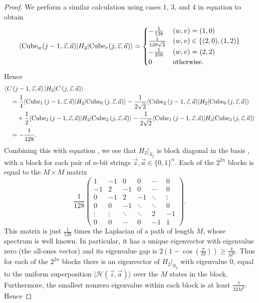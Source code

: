 \documentclass[../thesis-main/thesis-main]{subfiles}
\begin{document}
\begin{proof}
We perform a similar calculation using cases 1, 3, and 4 in equation  to obtain
\[
\langle{\operatorname{Cube}_{w}(j-1,\vec{z},\vec{a})}|H_{2}|{\operatorname{Cube}_{v}(j,\vec{z},\vec{a})}\rangle=\begin{cases}
-\frac{1}{128} & (w,v)=(1,0)\\
\frac{1}{128\sqrt{2}} & (w,v)\in\{(2,0),(1,2)\}\\
-\frac{1}{256} & (w,v)=(2,2)\\
0 & \text{otherwise.}
\end{cases}
\]
Hence 
\begin{align*}
 & \langle C\left(j-1,\vec{z},\vec{a}\right)|H_{2}|C\left(j,\vec{z},\vec{a}\right)\rangle\\
 &\quad =\frac{1}{4}\langle{\operatorname{Cube}_{1}\left(j-1,\vec{z},\vec{a}\right)}|H_{2}|{\operatorname{Cube}_{0}\left(j,\vec{z},\vec{a}\right)}\rangle-\frac{1}{2\sqrt{2}}\langle{\operatorname{Cube}_{2}\left(j-1,\vec{z},\vec{a}\right)}|H_{2}|{\operatorname{Cube}_{0}\left(j,\vec{z},\vec{a}\right)}\rangle\\
 &\qquad +\frac{1}{2}\langle{\operatorname{Cube}_{2}\left(j-1,\vec{z},\vec{a}\right)}|H_{2}|{\operatorname{Cube}_{2}\left(j,\vec{z},\vec{a}\right)}\rangle-\frac{1}{2\sqrt{2}}\langle{\operatorname{Cube}_{1}\left(j-1,\vec{z},\vec{a}\right)}|H_{2}|{\operatorname{Cube}_{2}\left(j,\vec{z},\vec{a}\right)}\rangle\\
 &\quad =-\frac{1}{128}.
\end{align*}
Combining this with equation , we see that $H_{2}|_{S_{2}}$ is block diagonal in the basis , with a block for each pair of $n$-bit strings $\vec{z},\vec{a}\in\{0,1\}^{n}$. Each of the $2^{2n}$ blocks is equal to the $M\times M$ matrix
\[
  \frac{1}{128}
  \begin{pmatrix}
    1 & -1 & 0 & 0 & \cdots & 0  \\
    -1 & 2 & -1 & 0 & \cdots & 0  \\
    0 & -1 & 2 & -1 & \ddots & \vdots \\
    0 & 0 & -1 & \ddots & \ddots & 0 \\
    \vdots & \vdots & \ddots & \ddots & 2 & -1 \\
    0 & 0 & \cdots & 0 & -1 & 1  
  \end{pmatrix}.
\]
This matrix is just $\frac{1}{128}$ times the Laplacian of a path of length $M$, whose spectrum is well known. In particular, it has a unique eigenvector with eigenvalue zero (the all-ones vector) and its eigenvalue gap is $2(1-\cos (\frac{\pi}{M}))\geq \frac{4}{M^2}$. Thus for each of the $2^{2n}$ blocks there is an eigenvector of $H_{2}|_{S_{2}}$ with eigenvalue $0$, equal to the uniform superposition $|\mathcal{H}(\vec{z},\vec{a})\rangle$ over the $M$ states in the block. Furthermore, the smallest nonzero eigenvalue within each block is at least $\frac{1}{32M^{2}}$. Hence

\end{proof}
\end{document}
